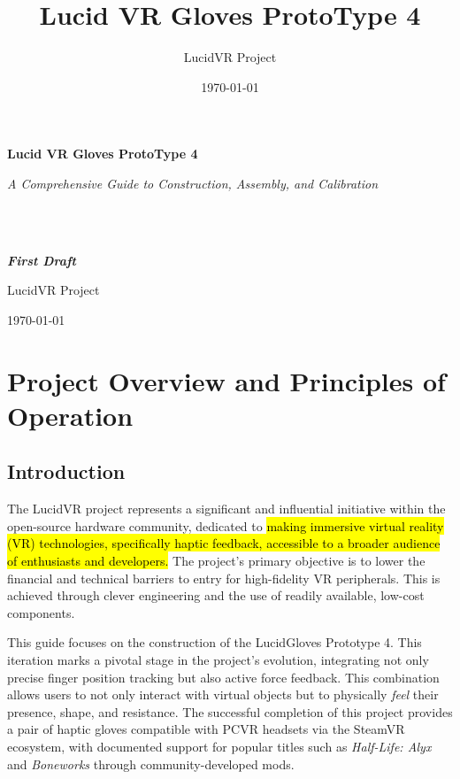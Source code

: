 \documentclass{article}
\title{\textbf{Lucid VR Gloves ProtoType 4}}
\author{LucidVR Project}
\date{\today}
\begin{document}
\begin{titlepage}
    \centering
    \vspace*{1in}
    
    {\Huge \bfseries Lucid VR Gloves ProtoType 4\par}
    
    \vspace{0.5cm}
    
    {\Large \itshape A Comprehensive Guide to Construction, Assembly, and Calibration\par}
     \\\\{\Large \itshape \textbf{First Draft}\par}
    \vfill
    
    {\large LucidVR Project\par}
    
    \vspace{0.8cm}
    
    {\large \today\par}
    
\end{titlepage}

\section{Project Overview and Principles of Operation}
\subsection{Introduction}
The LucidVR project represents a significant and influential initiative within the open-source hardware community, dedicated to \hl{making immersive virtual reality (VR) technologies, specifically haptic feedback, accessible to a broader audience of enthusiasts and developers.} The project's primary objective is to lower the financial and technical barriers to entry for high-fidelity VR peripherals. This is achieved through clever engineering and the use of readily available, low-cost components.

This guide focuses on the construction of the LucidGloves Prototype 4. This iteration marks a pivotal stage in the project's evolution, integrating not only precise finger position tracking but also active force feedback. This combination allows users to not only interact with virtual objects but to physically \textit{feel} their presence, shape, and resistance. The successful completion of this project provides a pair of haptic gloves compatible with PCVR headsets via the SteamVR ecosystem, with documented support for popular titles such as \textit{Half-Life: Alyx} and \textit{Boneworks} through community-developed mods.
\end{document}
